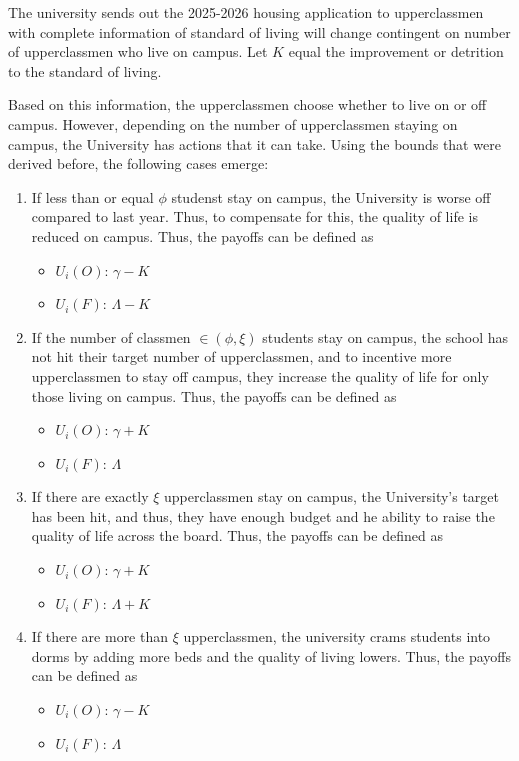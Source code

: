 \documentclass[12pt]{article}
\begin{document}
The university sends out the 2025-2026 housing application to upperclassmen with complete information of standard of living will change contingent on number of upperclassmen who live on campus. Let $K$ equal the improvement or detrition to the standard of living. 

Based on this information, the upperclassmen choose whether to live on or off campus.
However, depending on the number of upperclassmen staying on campus, the University has actions that it can take. Using the bounds that were derived before, the following cases emerge:
\begin{enumerate}
    \item If less than or equal $\phi$ studenst stay on campus, the University is worse off compared to last year. Thus, to compensate for this, the quality of life is reduced on campus. Thus, the payoffs can be defined as \begin{itemize}
        \item $U_i(O)$: $\gamma - K$
        \item $U_i(F)$: $\Lambda - K$
    \end{itemize}
    \item If the number of classmen  $ \in (\phi,\xi)$ students stay on campus, the school has not hit their target number of upperclassmen, and to incentive more upperclassmen to stay off campus, they increase the quality of life for only those living on campus. Thus, the payoffs can be defined as \begin{itemize}
        \item $U_i(O)$: $\gamma + K$
        \item $U_i(F)$: $\Lambda$
    \end{itemize}
    \item If there are exactly $\xi$ upperclassmen stay on campus, the University's target has been hit, and thus, they have enough budget and he ability to raise the quality of life across the board. Thus, the payoffs can be defined as \begin{itemize}
        \item $U_i(O)$: $\gamma + K$
        \item $U_i(F)$: $\Lambda + K$
    \end{itemize}
    \item If there are more than $\xi$ upperclassmen, the university crams students into dorms by adding more beds and the quality of living lowers. Thus, the payoffs can be defined as \begin{itemize}
        \item $U_i(O)$: $\gamma - K$
        \item $U_i(F)$: $\Lambda$
    \end{itemize}
\end{enumerate}
\end{document}
